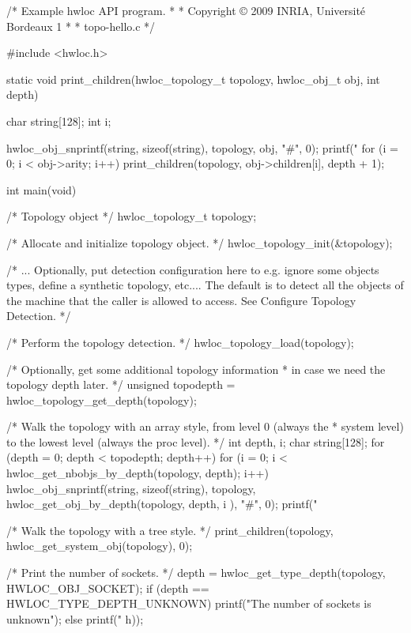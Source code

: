 \begin{DoxyCodeInclude}
/* Example hwloc API program.
 *
 * Copyright © 2009 INRIA, Université Bordeaux 1
 *
 * topo-hello.c 
 */

#include <hwloc.h>

static void print_children(hwloc_topology_t topology, hwloc_obj_t obj, int depth)
      
{
        char string[128];
        int i;

        hwloc_obj_snprintf(string, sizeof(string), topology, obj, "#", 0);
        printf("%
        for (i = 0; i < obj->arity; i++)
                print_children(topology, obj->children[i], depth + 1);
}

int main(void)
{
        /* Topology object */
        hwloc_topology_t topology;

        /* Allocate and initialize topology object.  */
        hwloc_topology_init(&topology);

        /* ... Optionally, put detection configuration here to e.g. ignore some
           objects types, define a synthetic topology, etc....  The default is
           to detect all the objects of the machine that the caller is allowed
           to access.
           See Configure Topology Detection.  */

        /* Perform the topology detection.  */
        hwloc_topology_load(topology);


        /* Optionally, get some additional topology information
         * in case we need the topology depth later.
         */
        unsigned topodepth = hwloc_topology_get_depth(topology);


        /* Walk the topology with an array style, from level 0 (always the
         * system level) to the lowest level (always the proc level). */
        int depth, i;
        char string[128];
        for (depth = 0; depth < topodepth; depth++) {
                for (i = 0; i < hwloc_get_nbobjs_by_depth(topology, depth); i++) 
      {
                        hwloc_obj_snprintf(string, sizeof(string), topology,
                                        hwloc_get_obj_by_depth(topology, depth, i
      ), "#", 0);
                        printf("%
                }
        }

        /* Walk the topology with a tree style.  */
        print_children(topology, hwloc_get_system_obj(topology), 0);


        /* Print the number of sockets.  */
        depth = hwloc_get_type_depth(topology, HWLOC_OBJ_SOCKET);
        if (depth == HWLOC_TYPE_DEPTH_UNKNOWN)
                printf("The number of sockets is unknown\n");
        else
                printf("%
      h));


}
\end{DoxyCodeInclude}
